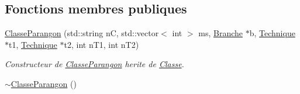 \subsection*{Fonctions membres publiques}
\begin{DoxyCompactItemize}
\item 
\hyperlink{classClasseParangon_a565c2ce61e6902eb9001c04cb9f22ba5}{Classe\-Parangon} (std\-::string n\-C, std\-::vector$<$ int $>$ ms, \hyperlink{classBranche}{Branche} $\ast$b, \hyperlink{classTechnique}{Technique} $\ast$t1, \hyperlink{classTechnique}{Technique} $\ast$t2, int n\-T1, int n\-T2)
\begin{DoxyCompactList}\small\item\em Constructeur de \hyperlink{classClasseParangon}{Classe\-Parangon} herite de \hyperlink{classClasse}{Classe}. \end{DoxyCompactList}\item 
\hypertarget{classClasseParangon_a0bdb8c5ad6c852a02b4d56d6dad7b166}{\hyperlink{classClasseParangon_a0bdb8c5ad6c852a02b4d56d6dad7b166}{$\sim$\-Classe\-Parangon} ()}\label{classClasseParangon_a0bdb8c5ad6c852a02b4d56d6dad7b166}


\end{DoxyCompactItemize}
